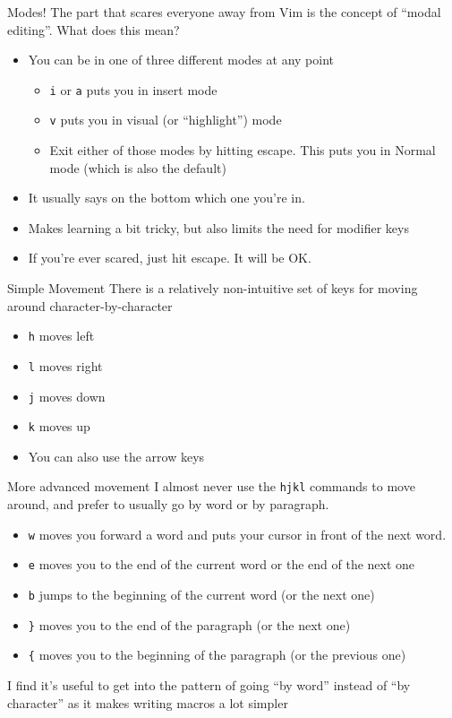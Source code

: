 \documentclass{beamer}
\begin{document}
\begin{frame}{Modes!}
	The part that scares everyone away from Vim is the concept of ``modal editing''. What does this mean? 
	\begin{itemize}
		\item You can be in one of three different modes at any point \begin{itemize}
				\item \texttt{i} or \texttt{a} puts you in insert mode
				\item \texttt{v} puts you in visual (or ``highlight'') mode
				\item Exit either of those modes by hitting escape.  This puts you in Normal mode (which is also the default)
		\end{itemize}
		
		\item It usually says on the bottom which one you're in. 
		\item Makes learning a bit tricky, but also limits the need for modifier keys
		\item If you're ever scared, just hit escape.  It will be OK. 
	\end{itemize}
\end{frame} 
\begin{frame}{Simple Movement}
  There is a relatively non-intuitive set of keys for moving around character-by-character
  \begin{itemize}
	  \item \texttt{h} moves left
	  \item \texttt{l} moves right 
	  \item \texttt{j} moves down 
	  \item \texttt{k} moves up 

          
  \end{itemize}
  \begin{itemize}
	  \item You can also use the arrow keys
          
  \end{itemize}
\end{frame}
\begin{frame}{More advanced movement}
	I almost never use the \texttt{hjkl} commands to move around, and prefer to usually go by word or by paragraph.  
	\begin{itemize}
		\item \texttt{w} moves you forward a word and puts your cursor in front of the next word. 
		\item \texttt{e} moves you to the end of the current word or the end of the next one
		\item \texttt{b} jumps to the beginning of the current word (or the next one)
		\item \texttt{\}} moves you to the end of the paragraph (or the next one)
		\item \texttt{\{} moves you to the beginning of the paragraph (or the previous one)
	\end{itemize}
	I find it's useful to get into the pattern of going ``by word'' instead of ``by character'' as it makes writing macros a lot simpler
\end{frame}
\end{document}

